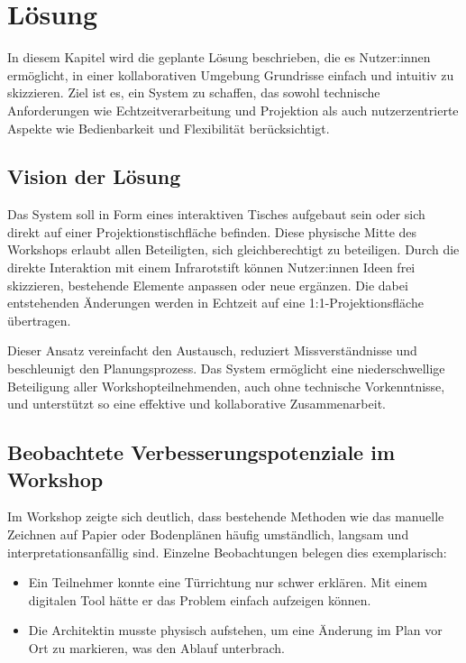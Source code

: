 \section{Lösung}

In diesem Kapitel wird die geplante Lösung beschrieben, die es Nutzer:innen ermöglicht, in einer kollaborativen Umgebung Grundrisse einfach und intuitiv zu skizzieren. Ziel ist es, ein System zu schaffen, das sowohl technische Anforderungen wie Echtzeitverarbeitung und Projektion als auch nutzerzentrierte Aspekte wie Bedienbarkeit und Flexibilität berücksichtigt.

\subsection{Vision der Lösung}

Das System soll in Form eines interaktiven Tisches aufgebaut sein oder sich direkt auf einer Projektionstischfläche befinden.  
Diese physische Mitte des Workshops erlaubt allen Beteiligten, sich gleichberechtigt zu beteiligen.  
Durch die direkte Interaktion mit einem Infrarotstift können Nutzer:innen Ideen frei skizzieren, bestehende Elemente anpassen oder neue ergänzen.  
Die dabei entstehenden Änderungen werden in Echtzeit auf eine 1:1-Projektionsfläche übertragen.

Dieser Ansatz vereinfacht den Austausch, reduziert Missverständnisse und beschleunigt den Planungsprozess.  
Das System ermöglicht eine niederschwellige Beteiligung aller Workshopteilnehmenden, auch ohne technische Vorkenntnisse, und unterstützt so eine effektive und kollaborative Zusammenarbeit.





\subsection{Beobachtete Verbesserungspotenziale im Workshop}
\label{sec:verbesserungspotentiale}

Im Workshop zeigte sich deutlich, dass bestehende Methoden wie das manuelle Zeichnen auf Papier oder Bodenplänen häufig umständlich, langsam und interpretationsanfällig sind. Einzelne Beobachtungen belegen dies exemplarisch:

\begin{itemize}
  \item Ein Teilnehmer konnte eine Türrichtung nur schwer erklären. Mit einem digitalen Tool hätte er das Problem einfach aufzeigen können.
  \item Die Architektin musste physisch aufstehen, um eine Änderung im Plan vor Ort zu markieren, was den Ablauf unterbrach.
\end{itemize}

